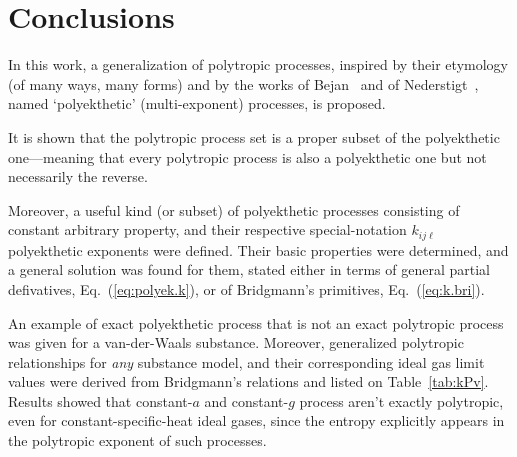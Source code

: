 \section{Conclusions}

    In this work, a generalization of polytropic processes, inspired by their etymology (of many
    ways,  many  forms)  and   by   the   works   of   Bejan~\cite{2006-BejanA-Wiley}   and   of
    Nederstigt~\cite{2017-NederstigtP-TUDelft}, named `polyekthetic' (multi-exponent) processes,
    is proposed.

    It is shown that the  polytropic  process  set  is  a  proper  subset  of  the  polyekthetic
    one---meaning that every polytropic process is also a polyekthetic one but  not  necessarily
    the reverse.

    Moreover, a useful kind  (or  subset)  of  polyekthetic  processes  consisting  of  constant
    arbitrary  property,  and  their  respective  special-notation   $k_{ij\ell}$   polyekthetic
    exponents were defined. Their basic properties were determined, and a general  solution  was
    found   for   them,   stated   either   in   terms   of   general    partial    defivatives,
    Eq.~(\ref{eq:polyek.k}), or of Bridgmann's primitives, Eq.~(\ref{eq:k.bri}).

    An example of exact polyekthetic process that is not an exact polytropic process  was  given
    for a van-der-Waals substance. Moreover, generalized polytropic relationships for \emph{any}
    substance  model,  and  their  corresponding  ideal  gas  limit  values  were  derived  from
    Bridgmann's relations and listed on Table~\ref{tab:kPv}. Results  showed  that  constant-$a$
    and constant-$g$ process aren't exactly polytropic, even  for  constant-specific-heat  ideal
    gases, since the entropy explicitly appears in the polytropic exponent of such processes.


